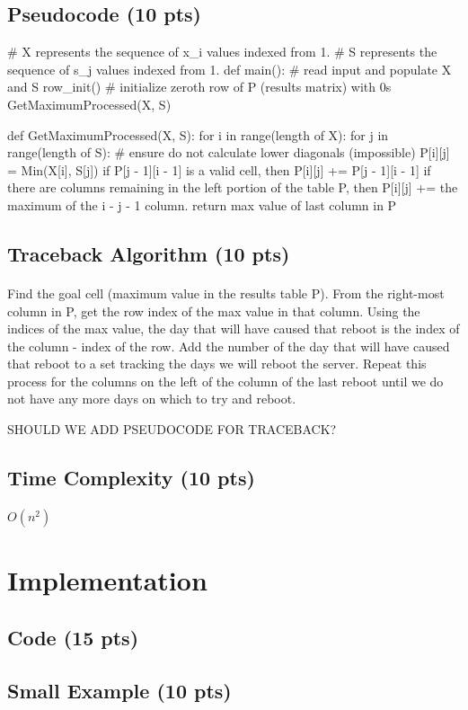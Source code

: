 \documentclass[12pt]{article}
\begin{document}
\subsection{Pseudocode (10 pts)}
\begin{verbatimtab}[4]
# X represents the sequence of x_i values indexed from 1.
# S represents the sequence of s_j values indexed from 1.
def main():
	# read input and populate X and S
	row_init()	# initialize zeroth row of P (results matrix) with 0s
	GetMaximumProcessed(X, S)

def GetMaximumProcessed(X, S):
	for i in range(length of X):
		for j in range(length of S):
			# ensure do not calculate lower diagonals (impossible)
			P[i][j] = Min(X[i], S[j])
			if P[j - 1][i - 1] is a valid cell,
				then P[i][j] += P[j - 1][i - 1]
			if there are columns remaining in the left portion of the table P,
				then P[i][j] += the maximum of the i - j - 1 column.
	return max value of last column in P 

\end{verbatimtab}
\subsection{Traceback Algorithm (10 pts)}
\paragraph{}
Find the goal cell (maximum value in the results table P).
From the right-most column in P, get the row index of the max value in that column.
Using the indices of the max value, the day that will have caused that reboot is the index of the column - index of the row.
Add the number of the day that will have caused that reboot to a set tracking the days we will reboot the server.
Repeat this process for the columns on the left of the column of the last reboot until we do not have any more days on which to try and reboot.
\begin{verbatimtab}[4]
SHOULD WE ADD PSEUDOCODE FOR TRACEBACK?
\end{verbatimtab}
\subsection{Time Complexity (10 pts)}
\paragraph{} $O(n^2)$
\section{Implementation}
\subsection{Code (15 pts)}
\subsection{Small Example (10 pts)}
\end{document}
